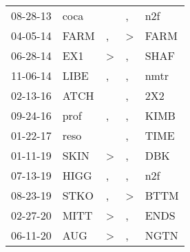 \begin{supertabular}{p{0.07\textwidth}p{0.06\textwidth}p{0.02\textwidth}p{0.02\textwidth}p{0.06\textwidth}}
          08-28-13\textsuperscript{} &           coca\textsuperscript{} &                  &                , &            n2f\textsuperscript{} \\
          04-05-14\textsuperscript{} &           FARM\textsuperscript{} &                , &     \textgreater &           FARM\textsuperscript{} \\
          06-28-14\textsuperscript{} &            EX1\textsuperscript{} &     \textgreater &                , &           SHAF\textsuperscript{} \\
          11-06-14\textsuperscript{} &           LIBE\textsuperscript{} &                , &                , &           nmtr\textsuperscript{} \\
          02-13-16\textsuperscript{} &           ATCH\textsuperscript{} &                  &                , &            2X2\textsuperscript{} \\
          09-24-16\textsuperscript{} &           prof\textsuperscript{} &                , &                , &           KIMB\textsuperscript{} \\
          01-22-17\textsuperscript{} &           reso\textsuperscript{} &                  &                , &           TIME\textsuperscript{} \\
          01-11-19\textsuperscript{} &           SKIN\textsuperscript{} &     \textgreater &                , &            DBK\textsuperscript{} \\
          07-13-19\textsuperscript{} &           HIGG\textsuperscript{} &                , &                , &            n2f\textsuperscript{} \\
          08-23-19\textsuperscript{} &           STKO\textsuperscript{} &                , &     \textgreater &           BTTM\textsuperscript{} \\
          02-27-20\textsuperscript{} &           MITT\textsuperscript{} &     \textgreater &                , &           ENDS\textsuperscript{} \\
          06-11-20\textsuperscript{} &            AUG\textsuperscript{} &     \textgreater &                , &           NGTN\textsuperscript{} \\
\end{supertabular}
